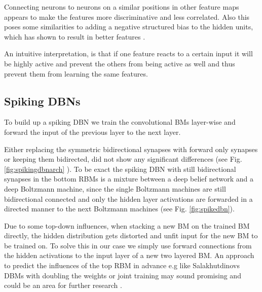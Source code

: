 Connecting neurons to neurons on a similar positions in other feature maps appears to make the features more discriminative and less correlated.
Also this poses some similarities to adding a negative structured bias to the hidden units, which has shown to result in better features \cite{NorouziM2009}\cite{LeCun}.

An intuitive interpretation, is that if one feature reacts to a certain input it will be highly active and prevent the others from being active as well and thus prevent them from learning the same features.  

\subsection{Spiking DBNs} \label{c:spikingdbn}

To build up a spiking DBN we train the convolutional BMs layer-wise and forward the input of the previous layer to the next layer.

Either replacing the symmetric bidirectional synapses with forward only synapses or keeping them bidirected, did not show any significant differences (see Fig. \ref{fig:spikingdbnarch} ). 
To be exact the spiking DBN with still bidirectional synapses in the bottom RBMs is a mixture between a deep belief network and a deep Boltzmann machine, since the single Boltzmann machines are still bidirectional connected and only the hidden layer activations are forwarded in a directed manner to the next Boltzmann machines (see Fig. \ref{fig:spikedbn}).

Due to some top-down influences, when stacking a new BM  on the trained BM directly, the hidden distribution gets distorted and unfit input for the new BM to be trained on. 
To solve this in our case we simply use forward connections from the hidden activations to the input layer of a new two layered BM. 
An approach to predict the influences of the top RBM in advance e.g like Salakhutdinovs DBMs with doubling the weights or joint training may sound promising and could be an area for further research \cite{salakhutdinov2009deep}.

